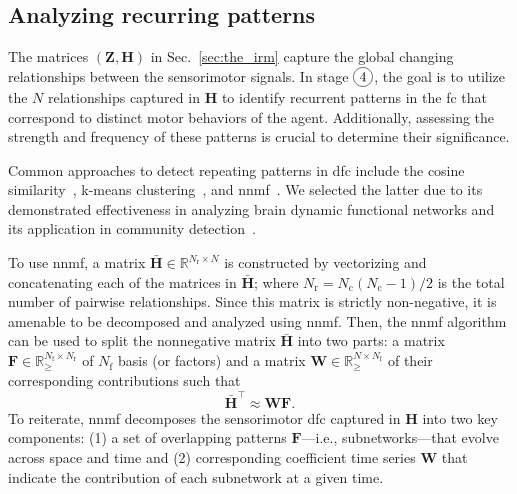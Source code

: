 \subsection{Analyzing recurring patterns}
The matrices $(\bm{Z}, \bm{H})$ in Sec.~\ref{sec:the_irm} capture the global changing relationships between the sensorimotor signals. In stage $\circled{4}$, the goal is to utilize the $N$ relationships captured in $\bm{H}$ to identify recurrent patterns in the \ac{fc} that correspond to distinct motor behaviors of the agent. Additionally, assessing the strength and frequency of these patterns is crucial to determine their significance. 

Common approaches to detect repeating patterns in \ac{dfc} include the cosine similarity~\cite{Menon2019comparisonstaticdynamic}, k-means clustering~\cite{Li2017Hightransitionfrequencies}, and  \ac{nnmf}~\cite{Fu2019Nonnegativematrixfactorization}. We selected the latter due to its demonstrated effectiveness in analyzing brain dynamic functional networks and its application in community  detection~\cite{Wang2011Communitydiscoveryusing,Luo2021Symmetricnonnegativematrix}.

To use \ac{nnmf}, a matrix $\bar{\bm{H}}\in \mathbb{R}^{N_\text{r}\times N}$ is constructed by vectorizing and concatenating each of the matrices in $\bar{\bm{H}}$; where $N_\text{r} = N_\text{c}(N_\text{c}-1)/2$ is the total number of pairwise relationships. Since this matrix is strictly non-negative, it is amenable to be decomposed and analyzed using \ac{nnmf}. Then, the \ac{nnmf} algorithm can be used to split the nonnegative matrix $\bar{\bm{H}}$ into two parts: a matrix $\bm{F} \in \mathbb{R}^{N_\text{f}\times N_\text{r}}_{\geq}$ of $N_\text{f}$ basis (or factors) and a matrix $\bm{W} \in \mathbb{R}^{N\times N_\text{f}}_{\geq}$ of their corresponding contributions such that
\begin{equation}
	\bar{\bm{H}}^\intercal \approx \bm{W} \bm{F}.
    \label{eq:nnmf}
\end{equation}
To reiterate, \ac{nnmf} decomposes the sensorimotor \ac{dfc} captured in $\bm{H}$ into two key components: (1) a set of overlapping patterns $\bm{F}$---i.e., subnetworks---that evolve across space and time and (2) corresponding coefficient time series $\bm{W}$ that indicate the contribution of each subnetwork at a given time.

